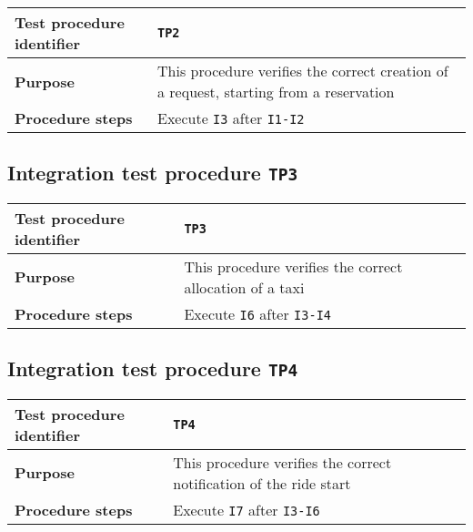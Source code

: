 \begin{table*}[!h]\centering\begin{tabularx}{.9\textwidth}{ >{\bfseries}l X }\toprule%
Test procedure identifier	&	\texttt{TP2}	\\\midrule
Purpose				&	This procedure verifies the correct creation of a request, starting from a reservation	\\\midrule
Procedure steps			&	Execute \texttt{I3} after \texttt{I1-I2}	\\
\bottomrule\end{tabularx}\end{table*}





\subsection*{Integration test procedure \normalfont\texttt{TP3}}

\begin{table*}[!h]\centering\begin{tabularx}{.9\textwidth}{ >{\bfseries}l X }\toprule%
Test procedure identifier	&	\texttt{TP3}	\\\midrule
Purpose				&	This procedure verifies the correct allocation of a taxi	\\\midrule
Procedure steps			&	Execute \texttt{I6} after \texttt{I3-I4}	\\
\bottomrule\end{tabularx}\end{table*}








\subsection*{Integration test procedure \normalfont\texttt{TP4}}

\begin{table*}[!h]\centering\begin{tabularx}{.9\textwidth}{ >{\bfseries}l X }\toprule%
Test procedure identifier	&	\texttt{TP4}	\\\midrule
Purpose				&	This procedure verifies the correct notification of the ride start	\\\midrule
Procedure steps			&	Execute \texttt{I7} after \texttt{I3-I6}		\\
\bottomrule\end{tabularx}\end{table*}

















